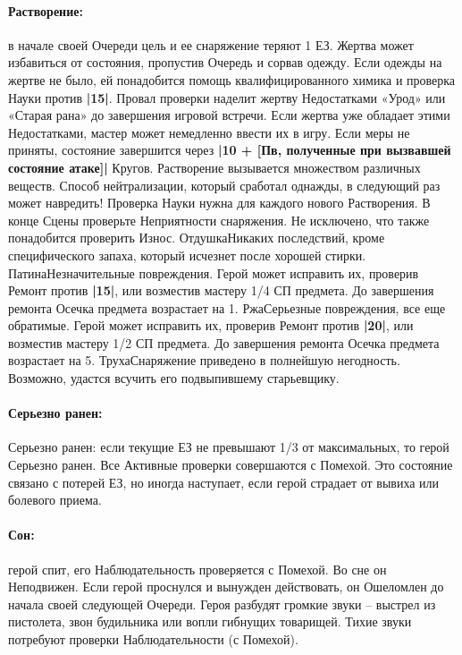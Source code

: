 \paragraph{Растворение:} в начале своей Очереди цель и ее снаряжение теряют 1 ЕЗ. Жертва может избавиться от состояния, пропустив Очередь и сорвав одежду. Если одежды на жертве не было, ей понадобится помощь квалифицированного химика и проверка Науки против \textbf{|15|}. Провал проверки наделит жертву Недостатками «Урод» или «Старая рана» до завершения игровой встречи. Если жертва уже обладает этими Недостатками, мастер может немедленно ввести их в игру.
\newline Если меры не приняты, состояние завершится через \textbf{|10 + [Пв, полученные при вызвавшей состояние атаке]|} Кругов.
\newline Растворение вызывается множеством различных веществ. Способ нейтрализации, который сработал однажды, в следующий раз может навредить! Проверка Науки нужна для каждого нового Растворения.
\newline В конце Сцены проверьте Неприятности снаряжения. Не исключено, что также понадобится проверить Износ.
\trouble
{Отдушка}{Никаких последствий, кроме специфического запаха, который исчезнет после хорошей стирки.}
{Патина}{Незначительные повреждения. Герой может исправить их, проверив Ремонт против \textbf{|15|}, или возместив мастеру 1/4 СП предмета. До завершения ремонта Осечка предмета возрастает на 1.}
{Ржа}{Серьезные повреждения, все еще обратимые. Герой может исправить их, проверив Ремонт против \textbf{|20|}, или возместив мастеру 1/2 СП предмета. До завершения ремонта Осечка предмета возрастает на 5.}
{Труха}{Снаряжение приведено в полнейшую негодность. Возможно, удастся всучить его подвыпившему старьевщику.}
\paragraph{Серьезно ранен:} Серьезно ранен: если текущие ЕЗ не превышают 1/3 от максимальных, то герой Серьезно ранен. Все Активные проверки совершаются с Помехой. 
\newline Это состояние связано с потерей ЕЗ, но иногда наступает, если герой страдает от вывиха или болевого приема. 
\paragraph{Сон:} герой спит, его Наблюдательность проверяется с Помехой. Во сне он Неподвижен. Если герой проснулся и вынужден действовать, он Ошеломлен до начала своей следующей Очереди. 
\newline Героя разбудят громкие звуки – выстрел из пистолета, звон будильника или вопли гибнущих товарищей. Тихие звуки потребуют проверки Наблюдательности (с Помехой).
